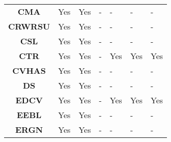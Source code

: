 \begin{table}[ht!]
\begin{tabular}{cllllll}
\textbf{CMA}         & Yes                                 & Yes                                 & -                                       & -                                        & -                                         & -                                         \\
\textbf{CRWRSU}      & Yes                                 & Yes                                 & -                                       & -                                        & -                                         & -                                         \\
\textbf{CSL}         & Yes                                 & Yes                                 & -                                       & -                                        & -                                         & -                                         \\
\textbf{CTR}         & Yes                                 & Yes                                 & -                                       & Yes                                      & Yes                                       & Yes                                       \\
\textbf{CVHAS}       & Yes                                 & Yes                                 & -                                       & -                                        & -                                         & -                                         \\
\textbf{DS}          & Yes                                 & Yes                                 & -                                       & -                                        & -                                         & -                                         \\
\textbf{EDCV}        & Yes                                 & Yes                                 & -                                       & Yes                                      & Yes                                       & Yes                                       \\
\textbf{EEBL}        & Yes                                 & Yes                                 & -                                       & -                                        & -                                         & -                                         \\
\textbf{ERGN}        & Yes                                 & Yes                                 & -                                       & -                                        & -                                         & -                                         \\

\end{tabular}
\end{table}
